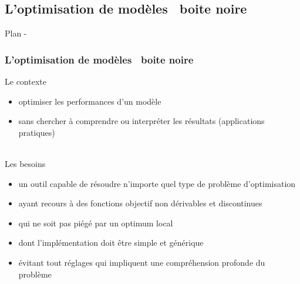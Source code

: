 \documentclass{beamer}
\begin{document}
\subsection{L'optimisation de modèles \og~boite noire~\fg}

\begin{frame}{Plan - \secname}
    \tableofcontents[sectionstyle=hide/hide,subsectionstyle=show/shaded/hide ]
\end{frame}


\begin{frame}
\frametitle{L'optimisation de modèles \og~boite noire~\fg}
Le contexte
\begin{itemize}
    \item optimiser les performances d'un modèle
    \item sans chercher à comprendre ou interpréter les résultats (applications pratiques)
\end{itemize}
~\\
Les besoins
\begin{itemize}
    \item un outil capable de résoudre n'importe quel type de problème d'optimisation
    \item ayant recours à des fonctions objectif non dérivables et discontinues
    \item qui ne soit pas piégé par un optimum local
    \item dont l'implémentation doit être simple et générique
    \item évitant tout réglages qui impliquent une compréhension profonde du problème
\end{itemize}
\end{frame}
\end{document}
